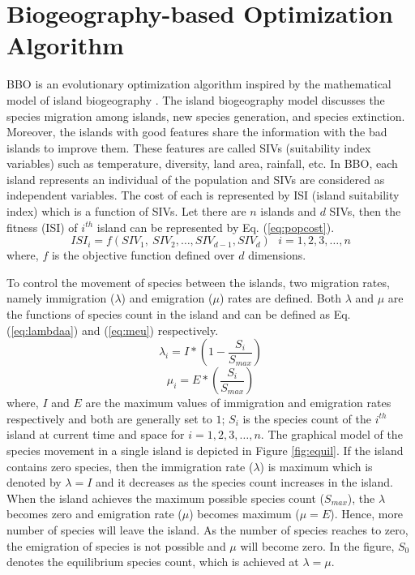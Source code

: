 \section{Biogeography-based Optimization Algorithm} \label{ch4:sec:bbo}

BBO \cite{Simon2008} is an evolutionary optimization algorithm inspired by the mathematical model of island biogeography \cite{kingsland2002}. The island biogeography model discusses the species migration among islands, new species generation, and species extinction. Moreover, the islands with good features share the information with the bad islands to improve them. These features are called SIVs (suitability index variables) such as temperature, diversity, land area, rainfall, etc. In BBO, each island represents an individual of the population and SIVs are considered as independent variables. The cost of each is represented by ISI (island suitability index) which is a function of SIVs. Let there are $n$ islands and $d$ SIVs, then the fitness (ISI) of $i^{th}$ island can be represented by Eq. (\ref{eq:popcost}).
\begin{equation}\label{eq:popcost}
ISI_i=f(SIV_1,\ SIV_2,\dots, SIV_{d-1}, SIV_d) \ \ \    i=1,2,3, \dots,n
\end{equation}
where, $f$ is the objective function defined over $d$ dimensions.

To control the movement of species between the islands, two migration rates, namely immigration ($\lambda$) and emigration ($\mu$) rates are defined. Both $\lambda$ and $\mu$ are the functions of species count in the island and can be defined as Eq. (\ref{eq:lambdaa}) and (\ref{eq:meu})  respectively. 
\begin{equation}\label{eq:lambdaa}
\lambda_i=I*(1- \frac {S_i} {S_{max}} )
\end{equation}
\begin{equation}\label{eq:meu}
\mu_i=E*(\frac {S_i}{S_{max}} )    
\end{equation}
where, $I$ and $E$ are the maximum values of immigration and emigration rates respectively and both are generally set to $1$; $S_i$ is the species count of the $i^{th}$ island at current time and space for $i=1,2,3, \dots ,n$. The graphical model of the species movement in a single island is depicted in Figure \ref{fig:equil}. If the island contains zero species, then the immigration rate ($\lambda$) is maximum which is denoted by $\lambda=I$ and it decreases as the  species count increases in the island. When the island achieves the maximum possible species count ($S_{max}$),  the $\lambda$ becomes zero and emigration rate ($\mu$) becomes maximum ($\mu=E$). Hence, more number of species will leave the island. As the number of species reaches to zero, the emigration of species is not possible and $\mu$ will become zero. In the figure, $S_0$ denotes the equilibrium species count, which is achieved at  $\lambda=\mu$.

